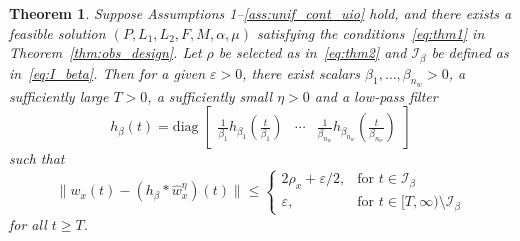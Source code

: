 \documentclass[times, doublespace]{rncauth}
\newtheorem{theorem}{Theorem}
\begin{document}
\begin{theorem}\label{thm:act_fault_unstable}
	Suppose Assumptions 1--\ref{ass:unif_cont_uio} hold, and there exists a feasible solution $(P, L_1, L_2, F, M, \alpha, \mu)$ satisfying the conditions~\eqref{eq:thm1} in Theorem~\ref{thm:obs_design}. Let $\rho$ be selected as in~\eqref{eq:thm2} and $\mathcal I_\beta$ be defined as in~\eqref{eq:I_beta}. 
	Then for a given $\varepsilon>0$, there exist scalars $\beta_1,\ldots,\beta_{n_w}>0$, a sufficiently large $T>0$, a sufficiently small $\eta>0$ and a low-pass filter 
	\begin{equation}\label{eq:filt}
	h_\beta(t) = \mathrm{diag}\;\begin{bmatrix}
	\frac{1}{\beta_1}h_{\beta_1}\left(\frac{t}{\beta_1}\right) & \cdots & \frac{1}{\beta_{n_w}}h_{\beta_{n_w}}\left(\frac{t}{\beta_{n_w}}\right)
	\end{bmatrix}
	\end{equation}
	such that
	\[
	\|w_x(t) - (h_\beta\ast \hat w^\eta_x)(t)\|\le \begin{cases}
	2\rho_x + \varepsilon/2, & \text{for }t\in \mathcal I_\beta\\
	\varepsilon, & \text{for } t\in [T, \infty)\setminus\mathcal{I}_\beta
	\end{cases}
	\]
	for all $t\ge T$.
\end{theorem}
\end{document}
